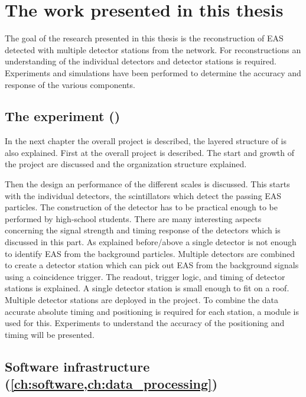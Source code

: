 \section{The work presented in this thesis}

The goal of the research presented in this thesis is the reconstruction of EAS detected with multiple detector stations from the \hisparc network. For reconstructions an understanding of the individual detectors and detector stations is required. Experiments and simulations have been performed to determine the accuracy and response of the various components.


\subsection{The \hisparc experiment
            ()}

In the next chapter the overall project is described, the layered structure of \hisparc is also explained. First at the overall project is described. The start and growth of the project are discussed and the organization structure explained.

Then the design an performance of the different scales is discussed. This starts with the individual detectors, the scintillators which detect the passing EAS particles. The construction of the detector has to be practical enough to be performed by high-school students. There are many interesting aspects concerning the signal strength and timing response of the detectors which is discussed in this part. As explained before/above a single detector is not enough to identify EAS from the background particles. Multiple detectors are combined to create a detector station which can pick out EAS from the background signals using a coincidence trigger. The readout, trigger logic, and timing of detector stations is explained. A single detector station is small enough to fit on a roof. Multiple detector stations are deployed in the \hisparc project. To combine the data accurate absolute timing and positioning is required for each station, a \gps module is used for this. Experiments to understand the accuracy of the \gps positioning and timing will be presented.


\subsection{Software infrastructure
            (\cref{ch:software,ch:data_processing})}

